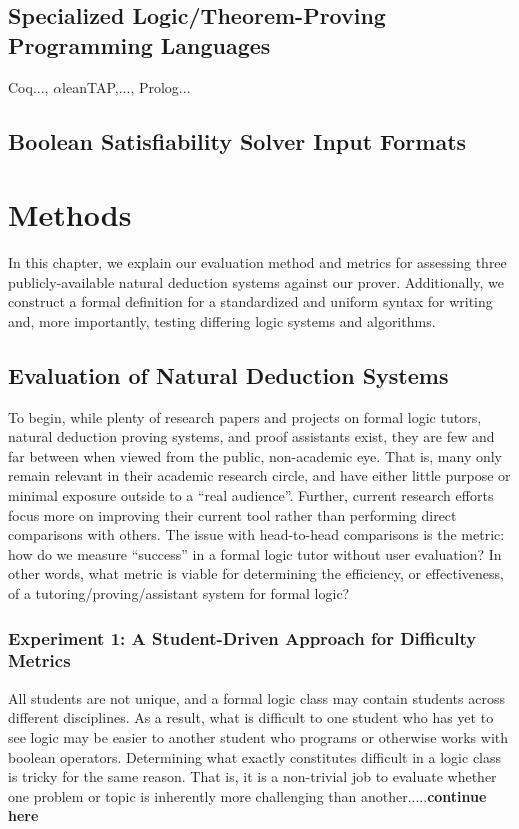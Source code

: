 \documentclass[ms]{uncgdissertationexp2}
\theoremstyle{plain}
\theoremstyle{definition}
\theoremstyle{remark}
\begin{document}
\section{Specialized Logic/Theorem-Proving Programming Languages}
Coq..., $\alpha$\textsf{lean}TAP,..., Prolog... 
\section{Boolean Satisfiability Solver Input Formats} 
\chapter{Methods}
In this chapter, we explain our evaluation method and metrics for assessing three publicly-available natural deduction systems against our prover. Additionally, we construct a formal definition for a standardized and uniform syntax for writing and, more importantly, testing differing logic systems and algorithms.
\section{Evaluation of Natural Deduction Systems}
To begin, while plenty of research papers and projects on formal logic tutors, natural deduction proving systems, and proof assistants exist, they are few and far between when viewed from the public, non-academic eye. That is, many only remain relevant in their academic research circle, and have either little purpose or minimal exposure outside to a ``real audience''. Further, current research efforts focus more on improving their current tool rather than performing direct comparisons with others. The issue with head-to-head comparisons is the metric: how do we measure ``success'' in a formal logic tutor without user evaluation? In other words, what metric is viable for determining the efficiency, or effectiveness, of a tutoring/proving/assistant system for formal logic?

\subsection{Experiment 1: A Student-Driven Approach for Difficulty Metrics}

All students are not unique, and a formal logic class may contain students across different disciplines. As a result, what is difficult to one student who has yet to see logic may be easier to another student who programs or otherwise works with boolean operators. Determining what exactly constitutes difficult in a logic class is tricky for the same reason. That is, it is a non-trivial job to evaluate whether one problem or topic is inherently more challenging than another.....\textbf{continue here}
\end{document}
